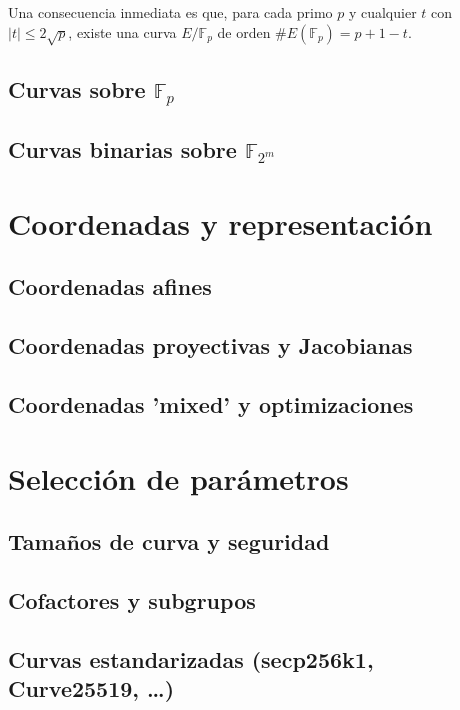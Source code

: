 Una consecuencia inmediata es que, para cada primo \(p\) y cualquier \(t\) con \(|t|\le2\sqrt p\), existe una curva \(E/\mathbb{F}_p\) de orden \(\#E(\mathbb{F}_p)=p+1-t\).


\subsection{Curvas sobre \texorpdfstring{$\mathbb{F}_p$}{Fp}}\label{sec:curvas_sobre_cuerpos_finitos_primos}
\subsection{Curvas binarias sobre \texorpdfstring{$\mathbb{F}_{2^m}$}{F2m}}\label{sec:curvas_sobre_cuerpos_finitos_binarios}

\section{Coordenadas y representación}\label{sec:coordenadas_curvas_elipticas}
\subsection{Coordenadas afines}
\subsection{Coordenadas proyectivas y Jacobianas}
\subsection{Coordenadas 'mixed' y optimizaciones}

\section{Selección de parámetros}
\subsection{Tamaños de curva y seguridad}
\subsection{Cofactores y subgrupos}
\subsection{Curvas estandarizadas (secp256k1, Curve25519, …)}
